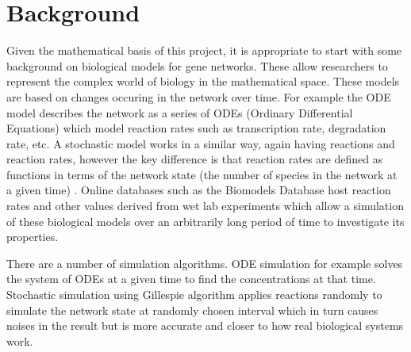 \documentclass{article}
\begin{document}
	
	
	\section{Background}
	
	
	\par Given the mathematical basis of this project, it is appropriate to start with some background on biological models for gene networks. These allow researchers to represent the complex world of biology in the mathematical space. These models are based on changes occuring in the network over time. For example the ODE model describes the network as a series of ODEs (Ordinary Differential Equations) which model reaction rates such as transcription rate, degradation rate, etc\cite{sim_tutorial}. A stochastic model works in a similar way, again having reactions and reaction rates, however the key difference is that reaction rates are defined as functions in terms of the network state (the number of species in the network at a given time) \cite{sim_tutorial}. Online databases such as the Biomodels Database \cite{biomodels} host reaction rates and other values derived from wet lab experiments which allow a simulation of these biological models over an arbitrarily long period of time to investigate its properties.
	
	\par There are a number of simulation algorithms. ODE simulation for example solves the system of ODEs at a given time to find the concentrations at that time. Stochastic simulation using Gillespie algorithm\cite{gillespie_original} applies reactions randomly to simulate the network state at randomly chosen interval which in turn causes noises in the result but is more accurate and closer to how real biological systems work.
	
\end{document}
